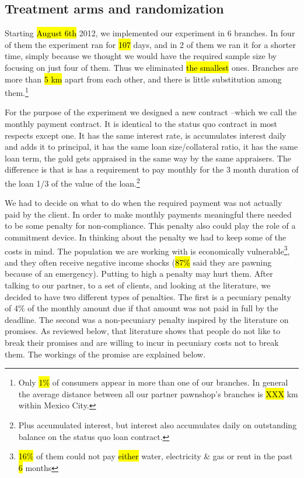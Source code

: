 \documentclass[11pt]{article}
\begin{document}
\subsection{Treatment arms and randomization}

Starting \hl{August 6th} 2012, we implemented our experiment in 6 branches. In four of them the experiment ran for \hl{107} days, and in 2 of them we ran it for a shorter time, simply because we thought we would have the required sample size by focusing on just four of them. Thus we eliminated \hl{the smallest} ones. Branches are more than \hl{5 km} apart from each other, and there is little substitution among them.\footnote{Only \hl{1\%} of consumers appear in more than one of our branches. In general the average distance between all our partner pawnshop's  branches is \hl{XXX} km within Mexico City.}

For the purpose of the experiment we designed a new contract --which we call the monthly payment contract. It is identical to the status quo contract in most respects except one. It has the same interest rate, is accumulates interest daily and adds it to principal, it has the same loan size/collateral ratio, it has the same loan term, the gold gets appraised in the same way by the same appraisers. The difference is that is has a requirement to pay monthly for the 3 month duration of the loan 1/3 of the value of the loan.\footnote{Plus accumulated interest, but interest also accumulates daily on outstanding balance on the status quo loan contract.} 

We had to decide on what to do when the required payment was not actually paid by the client. In order to make monthly payments meaningful there needed to be some penalty for non-compliance. This penalty also could play the role of a commitment device. In thinking about the penalty we had to keep some of the costs in mind. The population we are working with is economically vulnerable\footnote{\hl{16\%} of them could not pay \hl{either} water, electricity \& gas or rent in the past \hl{6} months}, and they often receive negative income shocks (\hl{87\%} said they are pawning because of an emergency). Putting to high a penalty may hurt them. After talking to our partner, to a set of clients, and looking at the literature, we decided to have two different types of penalties. The first is a pecuniary penalty of 4\% of the monthly amount due if that amount was not paid in full by the deadline. The second was a non-pecuniary penalty inspired by the literature on promises. As reviewed below, that literature shows that people do not like to break their promises and are willing to incur in pecuniary costs not to break them. The workings of the promise are explained below.
\end{document}
